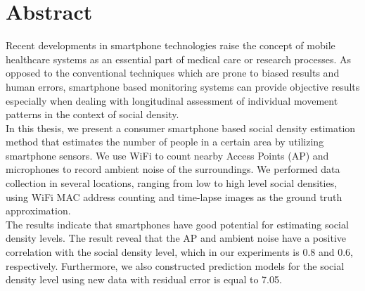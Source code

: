 \begingroup
\let\clearpage\relax
\let\cleardoublepage\relax
\let\cleardoublepage\relax

\chapter*{Abstract}
Recent developments in smartphone technologies raise the concept of mobile healthcare systems as an essential part of medical care or research processes. As opposed to the conventional techniques which are prone to biased results and human errors, smartphone based monitoring systems can provide objective results especially when dealing with longitudinal assessment of individual movement patterns in the context of social density.\\

\noindent
In this thesis, we present a consumer smartphone based social density estimation method that estimates the number of people in a certain area by utilizing smartphone sensors. We use WiFi to count nearby Access Points (AP) and microphones to record ambient noise of the surroundings. We performed data collection in several locations, ranging from low to high level social densities, using WiFi MAC address counting and time-lapse images as the ground truth approximation.\\

\noindent
The results indicate that smartphones have good potential for estimating social density levels. The result reveal that the AP and ambient noise have a positive correlation with the social density level, which in our experiments is 0.8 and 0.6, respectively. Furthermore, we also constructed prediction models for the social density level using new data with residual error is equal to 7.05.

\endgroup			

\vfill